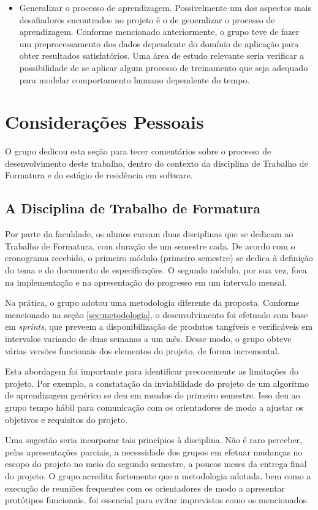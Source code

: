 \begin{itemize}
	\item Generalizar o processo de aprendizagem. Possivelmente um dos aspectos mais desafiadores encontrados no projeto é o de generalizar o processo de aprendizagem. Conforme mencionado anteriormente, o grupo teve de fazer um preprocessamento dos dados dependente do domínio de aplicação para obter resultados satisfatórios. Uma área de estudo relevante seria verificar a possibilidade de se aplicar algum processo de treinamento que seja adequado para modelar comportamento humano dependente do tempo.
\end{itemize}

\section{Considerações Pessoais} \label{sec:consideracoes_pessoais}
O grupo dedicou esta seção para tecer comentários sobre o processo de desenvolvimento deste trabalho, dentro do contexto da disciplina de Trabalho de Formatura e do estágio de residência em software.

\subsection{A Disciplina de Trabalho de Formatura}
Por parte da faculdade, os alunos cursam duas disciplinas que se dedicam ao Trabalho de Formatura, com duração de um semestre cada. De acordo com o cronograma recebido, o primeiro módulo (primeiro semestre) se dedica à definição do tema e do documento de especificações. O segundo módulo, por sua vez, foca na implementação e na apresentação do progresso em um intervalo mensal.

Na prática, o grupo adotou uma metodologia diferente da proposta. Conforme mencionado na seção \ref{sec:metodologia}, o desenvolvimento foi efetuado com base em \textit{sprints}, que preveem a disponibilização de produtos tangíveis e verificáveis em intervalos variando de duas semanas a um mês. Desse modo, o grupo obteve várias versões funcionais dos elementos do projeto, de forma incremental.

Esta abordagem foi importante para identificar precocemente as limitações do projeto. Por exemplo, a constatação da inviabilidade do projeto de um algoritmo de aprendizagem genérico se deu em meados do primeiro semestre. Isso deu ao grupo tempo hábil para comunicação com os orientadores de modo a ajustar os objetivos e requisitos do projeto.

Uma sugestão seria incorporar tais princípios à disciplina. Não é raro perceber, pelas apresentações parciais, a necessidade dos grupos em efetuar mudanças no escopo do projeto no meio do segundo semestre, a poucos meses da entrega final do projeto. O grupo acredita fortemente que a metodologia adotada, bem como a execução de reuniões frequentes com os orientadores de modo a apresentar protótipos funcionais, foi essencial para evitar imprevistos como os mencionados.


